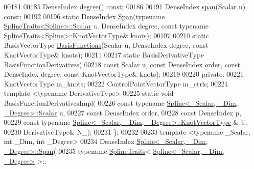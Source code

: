 \begin{DoxyCode}
00181 
00185     DenseIndex \hyperlink{group___splines___module_a0df23e941ac0f31dcd095a4dd4f4a7ec}{degree}() \textcolor{keyword}{const};
00186 
00191     DenseIndex \hyperlink{group___splines___module_ab62751802b4cc237aadb0dbf3455df98}{span}(Scalar u) \textcolor{keyword}{const};
00192 
00196     \textcolor{keyword}{static} DenseIndex \hyperlink{group___splines___module_aaba7632c61b84194e890696c2b57be1b}{Span}(\textcolor{keyword}{typename} \hyperlink{struct_eigen_1_1_spline_traits}{SplineTraits<Spline>::Scalar} u, 
      DenseIndex degree, \textcolor{keyword}{const} \textcolor{keyword}{typename} \hyperlink{struct_eigen_1_1_spline_traits}{SplineTraits<Spline>::KnotVectorType}& 
      \hyperlink{group___splines___module_ae3eac8af580ad880d8ad3a259d453aa1}{knots});
00197     
00210     \textcolor{keyword}{static} BasisVectorType \hyperlink{group___splines___module_a038506788499d71aedddc5211c33bb6e}{BasisFunctions}(Scalar u, DenseIndex degree, \textcolor{keyword}{const} KnotVectorType& 
      knots);
00211 
00217     \textcolor{keyword}{static} BasisDerivativeType \hyperlink{group___splines___module_a2e42e79b08b560007062b8f56689ae24}{BasisFunctionDerivatives}(
00218       \textcolor{keyword}{const} Scalar u, \textcolor{keyword}{const} DenseIndex order, \textcolor{keyword}{const} DenseIndex degree, \textcolor{keyword}{const} KnotVectorType& knots);
00219 
00220   \textcolor{keyword}{private}:
00221     KnotVectorType m\_knots; 
00222     ControlPointVectorType  m\_ctrls; 
00224     \textcolor{keyword}{template} <\textcolor{keyword}{typename} DerivativeType>
00225     \textcolor{keyword}{static} \textcolor{keywordtype}{void} BasisFunctionDerivativesImpl(
00226       \textcolor{keyword}{const} \textcolor{keyword}{typename} \hyperlink{group___splines___module_a8cafd78b564825c76fbb3419653d9742}{Spline<\_Scalar, \_Dim, \_Degree>::Scalar} u,
00227       \textcolor{keyword}{const} DenseIndex order,
00228       \textcolor{keyword}{const} DenseIndex p, 
00229       \textcolor{keyword}{const} \textcolor{keyword}{typename} \hyperlink{group___splines___module_a066f7a8b120316c9068b559f0790e9ec}{Spline<\_Scalar, \_Dim, \_Degree>::KnotVectorType}
      & U,
00230       DerivativeType& N\_);
00231   \};
00232 
00233   \textcolor{keyword}{template} <\textcolor{keyword}{typename} \_Scalar, \textcolor{keywordtype}{int} \_Dim, \textcolor{keywordtype}{int} \_Degree>
00234   DenseIndex \hyperlink{group___splines___module_aaba7632c61b84194e890696c2b57be1b}{Spline<\_Scalar, \_Dim, \_Degree>::Span}(
00235     \textcolor{keyword}{typename} \hyperlink{struct_eigen_1_1_spline_traits}{SplineTraits}< \hyperlink{group___splines___module_class_eigen_1_1_spline}{Spline<\_Scalar, \_Dim, \_Degree>} >::

\end{DoxyCode}
